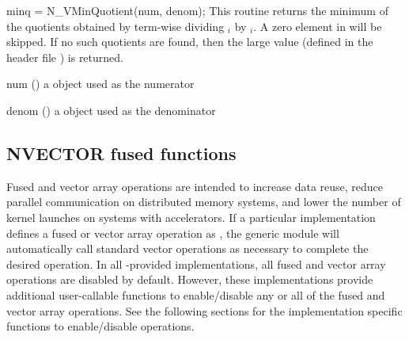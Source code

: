 {
  minq = N\_VMinQuotient(num, denom);
}
{
  This routine returns the minimum of the quotients obtained
  by term-wise dividing $_i$ by $_i$.
  A zero element in  will be skipped.
  If no such quotients are found, then the large value
   (defined in the header file )
  is returned.
}
{
  \begin{args}[x]
  \item[num] () a {\nvector} object used as the numerator
  \item[denom] () a {\nvector} object used as the denominator
  \end{args}
}
{
}
{}


\subsection{NVECTOR fused functions}\label{ss:nvecfusedops}

Fused and vector array operations are intended to increase data reuse, reduce
parallel communication on distributed memory systems, and lower the number of
kernel launches on systems with accelerators. If a particular {\nvector}
implementation defines a fused or vector array operation as , the
generic {\nvector} module will automatically call standard vector operations as
necessary to complete the desired operation.  In all
{\sundials}-provided {\nvector} implementations, all fused and vector
array operations are disabled by default.  However, these
implementations provide additional user-callable functions to enable/disable
any or all of the fused and vector array operations. See the following sections
for the implementation specific functions to enable/disable operations.



